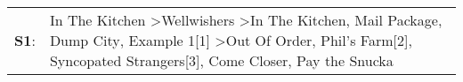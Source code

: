 \begin{supertabular}{p{0.03\textwidth}p{0.92\textwidth}}
 \textbf{S1}:  &  In The Kitchen\textsuperscript{} \textgreater \enspace Wellwishers\textsuperscript{} \textgreater \enspace In The Kitchen\textsuperscript{}, \enspace Mail Package\textsuperscript{}, \enspace Dump City\textsuperscript{}, \enspace Example 1[1]\textsuperscript{} \textgreater \enspace Out Of Order\textsuperscript{}, \enspace Phil's Farm[2]\textsuperscript{}, \enspace Syncopated Strangers[3]\textsuperscript{}, \enspace Come Closer\textsuperscript{}, \enspace Pay the Snucka\textsuperscript{}  \enspace  \\
\end{supertabular}
